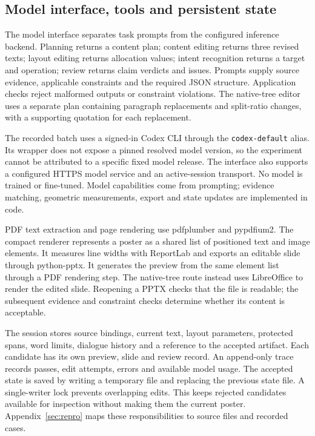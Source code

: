 \documentclass{article}
\begin{document}
\subsection{Model interface, tools and persistent state}
The model interface separates task prompts from the configured inference backend. Planning returns a content plan; content editing returns three revised texts; layout editing returns allocation values; intent recognition returns a target and operation; review returns claim verdicts and issues. Prompts supply source evidence, applicable constraints and the required JSON structure. Application checks reject malformed outputs or constraint violations. The native-tree editor uses a separate plan containing paragraph replacements and split-ratio changes, with a supporting quotation for each replacement.

The recorded batch uses a signed-in Codex CLI through the \texttt{codex-default} alias. Its wrapper does not expose a pinned resolved model version, so the experiment cannot be attributed to a specific fixed model release. The interface also supports a configured HTTPS model service and an active-session transport. No model is trained or fine-tuned. Model capabilities come from prompting; evidence matching, geometric measurements, export and state updates are implemented in code.

PDF text extraction and page rendering use pdfplumber and pypdfium2. The compact renderer represents a poster as a shared list of positioned text and image elements. It measures line widths with ReportLab and exports an editable slide through python-pptx. It generates the preview from the same element list through a PDF rendering step. The native-tree route instead uses LibreOffice to render the edited slide. Reopening a PPTX checks that the file is readable; the subsequent evidence and constraint checks determine whether its content is acceptable.

The session stores source bindings, current text, layout parameters, protected spans, word limits, dialogue history and a reference to the accepted artifact. Each candidate has its own preview, slide and review record. An append-only trace records passes, edit attempts, errors and available model usage. The accepted state is saved by writing a temporary file and replacing the previous state file. A single-writer lock prevents overlapping edits. This keeps rejected candidates available for inspection without making them the current poster. Appendix~\ref{sec:repro} maps these responsibilities to source files and recorded cases.
\end{document}
